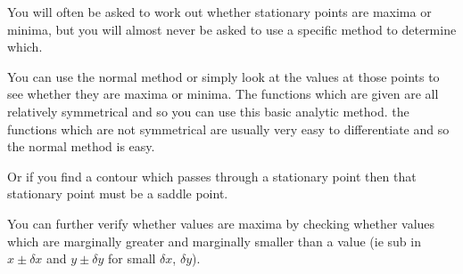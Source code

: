 \documentclass[10pt,\jkfside,a4paper]{article}
\begin{document}
You will often be asked to work out whether stationary points are maxima or minima, but you will almost never be asked to 
use a specific method to determine which. 

You can use the normal method or simply look at the values at those points to see whether 
they are maxima or minima. The functions which are given are all relatively symmetrical 
and so you can use this basic analytic method. the functions which are not symmetrical 
are usually very easy to differentiate and so the normal method is easy.

Or if you find a contour which passes through a stationary point then that stationary point must be a 
saddle point.

You can further verify whether values are maxima by checking whether values 
which are marginally greater and marginally smaller than a value (ie sub in $x \pm \delta x$ 
and $y \pm \delta y$ for small $\delta x$, $\delta y$).
\end{document}
